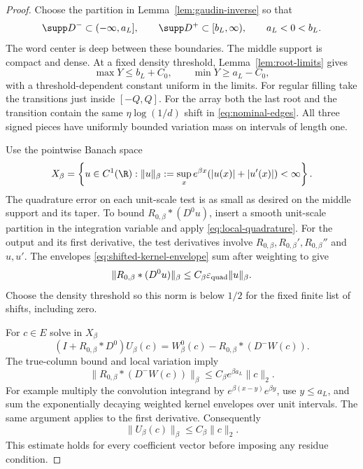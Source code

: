 \begin{proof}
Choose the partition in Lemma~\ref{lem:gaudin-inverse} so that
\[
 \supp D^-\subset(-\infty,a_L],\qquad
 \supp D^+\subset[b_L,\infty),\qquad a_L<0<b_L.
 \]
The word center is deep between these boundaries.  The middle
support is compact and dense.  At a fixed density threshold,
Lemma~\ref{lem:root-limits} gives
\begin{equation}\label{eq:last-node-split}
 \max Y\le b_L+C_0,\qquad \min Y\ge a_L-C_0,
\end{equation}
with a threshold-dependent constant uniform in the limits.
For regular filling take the transitions just inside $[-Q,Q]$.
For the array both the last root and the transition contain the
same $\eta\log(1/d)$ shift in \eqref{eq:nominal-edges}.
All three signed pieces have uniformly bounded variation mass
on intervals of length one.

Use the pointwise Banach space
\[
 X_\beta=\left\{u\in C^1(\R):
       \|u\|_\beta:=\sup_x e^{\beta x}
                  (|u(x)|+|u'(x)|)<\infty\right\}.
\]
The quadrature error on each unit-scale test is as small as desired
on the middle support and its taper.  To bound
$R_{0,\beta}*(D^0u)$, insert a smooth unit-scale partition in the
integration variable and apply \eqref{eq:local-quadrature}.
For the output and its first derivative, the test derivatives
involve $R_{0,\beta},R_{0,\beta}',R_{0,\beta}''$ and $u,u'$.
The envelopes \eqref{eq:shifted-kernel-envelope} sum after
weighting to give
\[
 \|R_{0,\beta}*(D^0u)\|_\beta
       \le C_\beta\varepsilon_{\rm quad}\|u\|_\beta.
\]
Choose the density threshold so this norm is below $1/2$ for the
fixed finite list of shifts, including zero.

For $c\in E$ solve in $X_\beta$
\begin{equation}\label{eq:shifted-middle-equation}
 (I+R_{0,\beta}*D^0)U_\beta(c)
     =W^0_\beta(c)-R_{0,\beta}*(D^-W(c)).
\end{equation}
The true-column bound and local variation imply
\[
 \|R_{0,\beta}*(D^-W(c))\|_\beta
       \le C_\beta e^{\beta a_L}\|c\|_2.
\]
For example multiply the convolution integrand by
$e^{\beta(x-y)}e^{\beta y}$, use $y\le a_L$, and sum the
exponentially decaying weighted kernel envelopes over unit
intervals.  The same argument applies to the first derivative.
Consequently
\begin{equation}\label{eq:shifted-solution-bound}
 \|U_\beta(c)\|_\beta\le C_\beta\|c\|_2.
\end{equation}
This estimate holds for every coefficient vector before imposing
any residue condition.


\end{proof}
